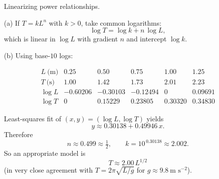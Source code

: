 \documentclass[11pt]{article}
\def\textbf#1{#1}%
\begin{document}

\begin{solution}
\textbf{Linearizing power relationships.}

\textbf{(a)} If $T=kL^n$ with $k>0$, take common logarithms:
\[
\log T = \log k + n\,\log L,
\]
which is linear in $\log L$ with gradient $n$ and intercept $\log k$.

\textbf{(b)} Using base-$10$ logs:

\[
\begin{array}{c|ccccc}
L\ \text{(m)} & 0.25 & 0.50 & 0.75 & 1.00 & 1.25\\\hline
T\ \text{(s)} & 1.00 & 1.42 & 1.73 & 2.01 & 2.23\\
\log L & -0.60206 & -0.30103 & -0.12494 & 0 & 0.09691\\
\log T & 0 & 0.15229 & 0.23805 & 0.30320 & 0.34830
\end{array}
\]

Least-squares fit of $(x,y)=(\log L,\log T)$ yields
\[
y \approx 0.30138 + 0.49946\,x.
\]
Therefore
\[
n \approx 0.499 \approx \tfrac{1}{2}, 
\qquad
k = 10^{\,0.30138} \approx 2.002.
\]
So an appropriate model is
\[
\boxed{\,T \approx 2.00\,L^{1/2}\,}
\]
(in very close agreement with $T=2\pi\sqrt{L/g}$ for $g\approx 9.8\ \text{m s}^{-2}$).

\begin{center}
\end{center}
\end{solution}

\end{document}
